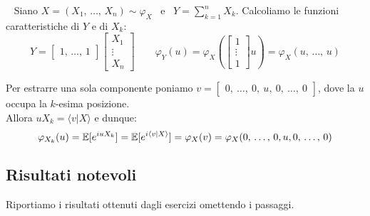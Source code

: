 \medskip
\begin{ese}
  \ \newline
  Siano $X=(X_1, \, \dots, \, X_n) \sim \varphi_X \enspace$ e $\enspace Y=\sum_{k=1}^{n}X_k$. Calcoliamo le funzioni caratteristiche di $Y$ e di $X_k$:
  $$
    Y = \begin{bmatrix} 1, \, \dots, \,  1\end{bmatrix}
    \begin{bmatrix} X_1 \\ \vdots \\ X_n \end{bmatrix} \qquad
    \varphi_Y(u) = \varphi_X \left(
      \begin{bmatrix} 1 \\ \vdots \\ 1 \end{bmatrix} u
    \right) = \varphi_X(u, \, \dots, \, u)
  $$

  Per estrarre una sola componente poniamo $v = \begin{bmatrix} 0 ,\ \dots ,\ 0 ,\ u ,\ 0 ,\ \dots ,\ 0 \end{bmatrix}$, dove la $u$ occupa la $k$-esima posizione.  \\
  Allora $uX_k =\langle v|X \rangle$ e dunque:
  $$
    \varphi_{X_k}(u) = \mathbb E[e^{iuX_k}] = \mathbb E[e^{i\langle v|X\rangle}] = \varphi_X(v) = \varphi_X(0, \, \dots, \, 0,u,0, \, \dots, \, 0)
  $$
\end{ese}

\subsection{Risultati notevoli}
Riportiamo i risultati ottenuti dagli esercizi omettendo i passaggi.
